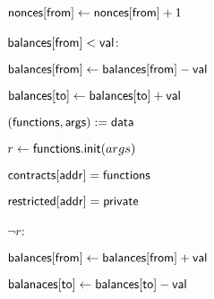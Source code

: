 \begin{bbox}[title=\msf{ExecContractCreate(addr, val, data, from, private)}]

${\mathsf {nonces[from]}} \leftarrow {\mathsf {nonces[from]}} + 1$

\If ${\mathsf {balances[from]}} < {\mathsf {val}}$: \reject

${\mathsf {balances[from]}} \leftarrow {\mathsf {balances[from]}} - {\mathsf {val}}$

${\mathsf {balances[to]}} \leftarrow {\mathsf {balances[to]}} + {\mathsf {val}}$

$({\mathsf {functions}}, {\mathsf {args}}) := {\mathsf {data}}$

$r \leftarrow {\mathsf {functions.init}}(args)$

${\mathsf {contracts[addr]}} = {\mathsf {functions}}$

${\mathsf {restricted[addr]}} = {\mathsf {private}}$

\If $\neg r$:

\quad ${\mathsf {balances[from]}} \leftarrow {\mathsf {balances[from]}} + {\mathsf {val}}$

\quad ${\mathsf {balanaces[to]}} \leftarrow {\mathsf {balances[to]}} - {\mathsf {val}}$
\end{bbox}
